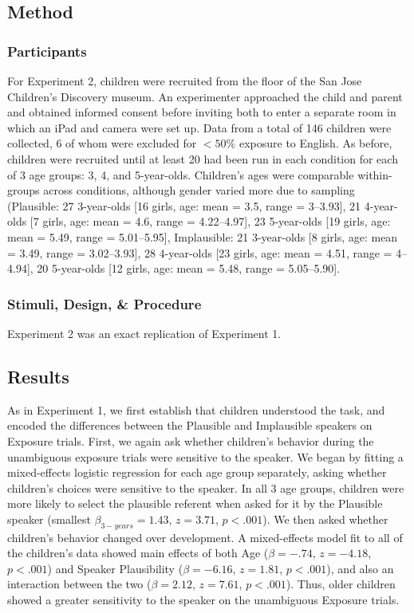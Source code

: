 \documentclass[man,floatsintext]{apa6}
\begin{document}
\subsection{Method}

\subsubsection{Participants}

For Experiment 2, children were recruited from the floor of the San Jose Children's Discovery museum. An experimenter approached the child and parent and obtained informed consent before inviting both to enter a separate room in which an iPad and camera were set up. Data from a total of 146 children were collected, 6 of whom were excluded for $<50\%$ exposure to English. As before, children were recruited until at least 20 had been run in each condition for each of 3 age groups: 3, 4, and 5-year-olds. Children's ages were comparable within-groups across conditions, although gender varied more due to sampling (Plausible: 27 3-year-olds [16 girls, age: mean = 3.5, range = 3--3.93], 21 4-year-olds [7 girls, age: mean = 4.6, range = 4.22--4.97], 23 5-year-olds [19 girls, age: mean = 5.49, range = 5.01--5.95], Implausible: 21 3-year-olds [8 girls, age: mean = 3.49, range = 3.02--3.93], 28 4-year-olds [23 girls, age: mean = 4.51, range = 4--4.94], 20 5-year-olds [12 girls, age: mean = 5.48, range = 5.05--5.90].


\subsubsection{Stimuli, Design, \& Procedure}

Experiment 2 was an exact replication of Experiment 1.

\subsection{Results}

As in Experiment 1, we first establish that children understood the task, and encoded the differences between the Plausible and Implausible speakers on Exposure trials. First, we again ask whether children's behavior during the unambiguous exposure trials were sensitive to the speaker. We began by fitting a mixed-effects logistic regression for each age group separately, asking whether children's choices were sensitive to the speaker. In all 3 age groups, children were more likely to select the plausible referent when asked for it by the Plausible speaker (smallest $\beta_{3-years} = 1.43$, $z = 3.71$, $p < .001$). We then asked whether children's behavior changed over development. A mixed-effects model fit to all of the children's data showed main effects of both Age ($\beta = -.74$, $z = -4.18$, $p < .001$) and Speaker Plausibility ($\beta = -6.16$, $z = 1.81$, $p < .001$), and also an interaction between the two ($\beta = 2.12$, $z = 7.61$, $p < .001$). Thus, older children showed a greater sensitivity to the speaker on the unambiguous Exposure trials.
\end{document}
